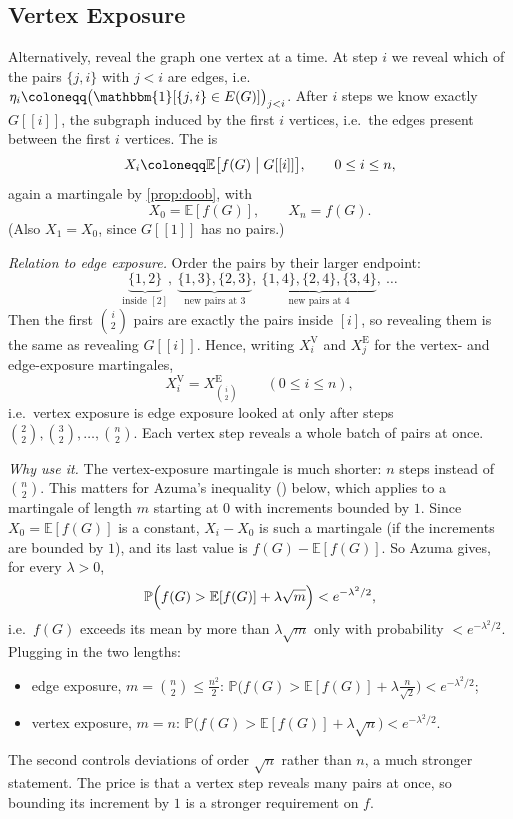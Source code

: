 \subsection{Vertex Exposure}\label{sec:vertex-exposure}

Alternatively, reveal the graph one vertex at a time. At step \(i\) we reveal which of the pairs \(\{j, i\}\) with \(j < i\) are edges, i.e.\ \(\eta_{i} \coloneqq \bigl( \mathbbm{1}[\{j, i\} \in E(G)] \bigr)_{j < i}\). After \(i\) steps we know exactly \(G[[i]]\), the subgraph induced by the first \(i\) vertices, i.e.\ the edges present between the first \(i\) vertices. The  is
\[
    X_{i} \coloneqq \mathbb{E}\bigl[ f(G) \bigm| G[[i]] \bigr], \qquad 0 \le i \le n ,
\]
again a martingale by \autoref{prop:doob}, with
\[
    X_{0} = \mathbb{E}[f(G)], \qquad X_{n} = f(G) .
\]
(Also \(X_{1} = X_{0}\), since \(G[[1]]\) has no pairs.)

\emph{Relation to edge exposure.} Order the pairs by their larger endpoint:
\[
    \underbrace{\{1,2\}}_{\text{inside } [2]}, \
    \underbrace{\{1,3\}, \{2,3\}}_{\text{new pairs at } 3}, \
    \underbrace{\{1,4\}, \{2,4\}, \{3,4\}}_{\text{new pairs at } 4}, \
    \ldots
\]
Then the first \(\binom{i}{2}\) pairs are exactly the pairs inside \([i]\), so revealing them is the same as revealing \(G[[i]]\). Hence, writing \(X^{\mathrm{V}}_{i}\) and \(X^{\mathrm{E}}_{j}\) for the vertex- and edge-exposure martingales,
\[
    X^{\mathrm{V}}_{i} = X^{\mathrm{E}}_{\binom{i}{2}} \qquad (0 \le i \le n) ,
\]
i.e.\ vertex exposure is edge exposure looked at only after steps \(\binom{2}{2}, \binom{3}{2}, \ldots, \binom{n}{2}\). Each vertex step reveals a whole batch of pairs at once.

\emph{Why use it.} The vertex-exposure martingale is much shorter: \(n\) steps instead of \(\binom{n}{2}\). This matters for Azuma's inequality () below, which applies to a martingale of length \(m\) starting at \(0\) with increments bounded by \(1\). Since \(X_{0} = \mathbb{E}[f(G)]\) is a constant, \(X_{i} - X_{0}\) is such a martingale (if the increments are bounded by \(1\)), and its last value is \(f(G) - \mathbb{E}[f(G)]\). So Azuma gives, for every \(\lambda > 0\),
\[
    \mathbb{P}\Bigl( f(G) > \mathbb{E}[f(G)] + \lambda\sqrt{m} \Bigr) < e^{-\lambda^{2}/2} ,
\]
i.e.\ \(f(G)\) exceeds its mean by more than \(\lambda\sqrt{m}\) only with probability \(< e^{-\lambda^{2}/2}\). Plugging in the two lengths:
\begin{itemize}
    \item edge exposure, \(m = \binom{n}{2} \le \frac{n^{2}}{2}\): \quad \(\mathbb{P}\bigl( f(G) > \mathbb{E}[f(G)] + \lambda \frac{n}{\sqrt{2}} \bigr) < e^{-\lambda^{2}/2}\);
    \item vertex exposure, \(m = n\): \quad \(\mathbb{P}\bigl( f(G) > \mathbb{E}[f(G)] + \lambda \sqrt{n} \bigr) < e^{-\lambda^{2}/2}\).
\end{itemize}
The second controls deviations of order \(\sqrt{n}\) rather than \(n\), a much stronger statement. The price is that a vertex step reveals many pairs at once, so bounding its increment by \(1\) is a stronger requirement on \(f\).

